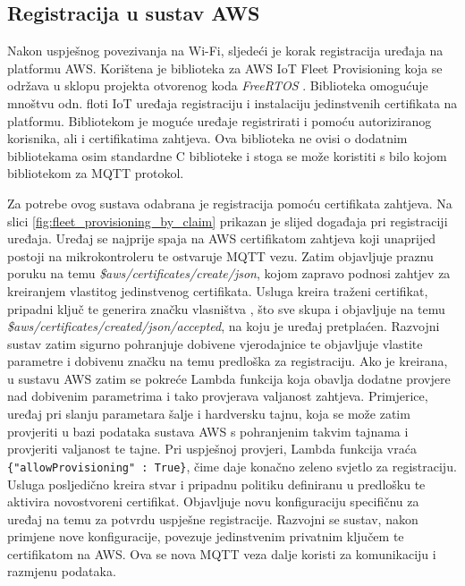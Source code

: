 \subsection{Registracija u sustav AWS}

Nakon uspješnog povezivanja na Wi-Fi, sljedeći je korak registracija uređaja na platformu AWS. Korištena je biblioteka za AWS IoT Fleet Provisioning koja se održava u sklopu projekta otvorenog koda \textit{FreeRTOS} \cite{fleet_prov_sdk}. Biblioteka omogućuje mnoštvu odn. floti IoT uređaja registraciju i instalaciju jedinstvenih certifikata na platformu. Bibliotekom je moguće uređaje registrirati i pomoću autoriziranog korisnika, ali i certifikatima zahtjeva. Ova biblioteka ne ovisi o dodatnim bibliotekama osim standardne C biblioteke i stoga se može koristiti s bilo kojom bibliotekom za MQTT protokol.

Za potrebe ovog sustava odabrana je registracija pomoću certifikata zahtjeva. Na slici \ref{fig:fleet_provisioning_by_claim} prikazan je slijed događaja pri registraciji uređaja. Uređaj se najprije spaja na AWS certifikatom zahtjeva koji unaprijed postoji na mikrokontroleru te ostvaruje MQTT vezu. Zatim objavljuje praznu poruku na temu \textit{\$aws/certificates/create/json}, kojom zapravo podnosi zahtjev za kreiranjem vlastitog jedinstvenog certifikata. Usluga kreira traženi certifikat, pripadni ključ te generira značku vlasništva , što sve skupa i objavljuje na temu \textit{\$aws/certificates/created/json/accepted}, na koju je uređaj pretplaćen. Razvojni sustav zatim sigurno pohranjuje dobivene vjerodajnice te objavljuje vlastite parametre i dobivenu značku na temu predloška za registraciju. Ako je kreirana, u sustavu AWS zatim se pokreće Lambda funkcija koja obavlja dodatne provjere nad dobivenim parametrima i tako provjerava valjanost zahtjeva. Primjerice, uređaj pri slanju parametara šalje i hardversku tajnu, koja se može zatim provjeriti u bazi podataka sustava AWS s pohranjenim takvim tajnama i provjeriti valjanost te tajne. Pri uspješnoj provjeri, Lambda funkcija vraća \lstinline|{"allowProvisioning" : True}|, čime daje konačno zeleno svjetlo za registraciju. Usluga posljedično kreira stvar i pripadnu politiku definiranu u predlošku te aktivira novostvoreni certifikat. Objavljuje novu konfiguraciju specifičnu za uređaj na temu za potvrdu uspješne registracije. Razvojni se sustav, nakon primjene nove konfiguracije, povezuje jedinstvenim privatnim ključem te certifikatom na AWS. Ova se nova MQTT veza dalje koristi za komunikaciju i razmjenu podataka.

